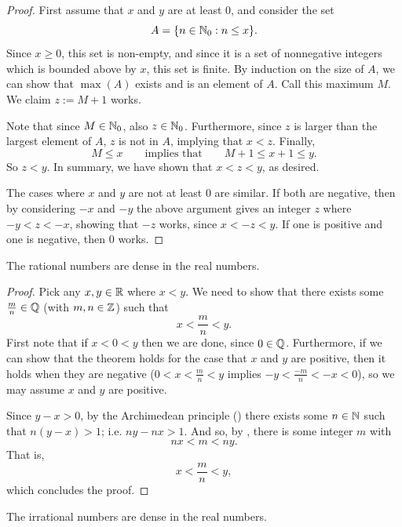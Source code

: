\begin{proof}
  First assume that $x$ and $y$ are at least 0, and consider the set
  \[ A = \{ n \in \mathbb N_0 : n \leq x \}. \]
  Since $x \geq 0$, this set is non-empty, and since it is a set of
  nonnegative integers which is bounded above by $x$, this set is
  finite. By induction on the size of $A$, we can show that $\max(A)$
  exists and is an element of $A$. Call this maximum $M$. We claim $z
  := M + 1$ works.

  Note that since $M \in \mathbb N_0$, also $z \in \mathbb N_0$. Furthermore,
  since $z$ is larger than the largest element of $A$, $z$ is not in
  $A$, implying that $x < z$. Finally,
  \[ M \leq x \qquad \text{implies that} \qquad M + 1 \leq x + 1 \leq y. \]
  So $z < y$. In summary, we have shown that $x < z < y$, as desired.

  The cases where $x$ and $y$ are not at least 0 are similar. If both
  are negative, then by considering $-x$ and $-y$ the above argument
  gives an integer $z$ where $-y < z < -x$, showing that $-z$ works,
  since $x < -z < y$. If one is positive and one is negative, then 0 works.
\end{proof}

\begin{theorem}[$\QQ$ is dense in $\RR$]
  The rational numbers are dense in the real numbers.
\end{theorem}

\begin{proof}
  Pick any $x, y \in \mathbb R$ where $x < y$. We need to show that there
  exists some $\frac{m}{n} \in \mathbb Q$ (with $m, n \in \mathbb Z$) such that
  \[ x < \frac{m}{n} < y. \]
  First note that if $x < 0 < y$ then we are done, since $0 \in \mathbb Q$.
  Furthermore, if we can show that the theorem holds for the case
  that $x$ and $y$ are positive, then it holds when they are negative
  ($0 < x < \frac{m}{n} < y$ implies $-y < \frac{-m}{n} < -x < 0$),
  so we may assume $x$ and $y$ are positive.

  Since $y - x > 0$, by the Archimedean principle
  () there exists some $n \in \mathbb N$ such
  that $n (y - x) > 1$; i.e. $ny - nx > 1$. And so, by
  , there is some integer $m$ with
  \[ nx < m < ny. \]
  That is,
  \[ x < \frac{m}{n} < y, \]
  which concludes the proof.
\end{proof}

\begin{corollary}
  The irrational numbers are dense in the real numbers.
\end{corollary}

